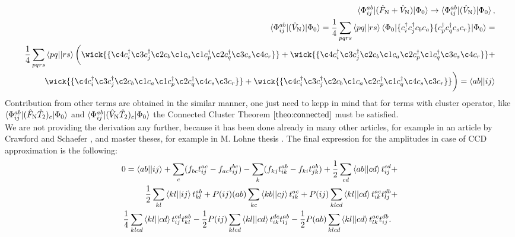 \documentclass[twoside,english]{uiofysmaster}
\theoremstyle{definition}
\begin{document}
\begin{eqnarray}
\braket{\Phi_{ij}^{ab}|(\hat{F}_\text{N}+\hat{V}_\text{N})|\Phi_0} \rightarrow \braket{\Phi_{ij}^{ab}|(\hat{V}_\text{N})|\Phi_0},\nonumber \\
\braket{\Phi_{ij}^{ab}|(\hat{V}_\text{N})|\Phi_0} = \frac{1}{4}\sum_{pqrs} \braket{pq||rs}\braket{\Phi_0| \{  c_i^\dagger c_j^\dagger  c_b  c_a \} \{  c_p^\dagger c_q^\dagger  c_s  c_r \} |\Phi_0}=\nonumber \\
 \frac{1}{4}\sum_{pqrs} \braket{pq||rs} \bigg( \wick{ \{ \c4 c_i^\dagger \c3 c_j^\dagger \c2 c_b \c1 c_a \c1  c_p^\dagger \c2 c_q^\dagger \c3 c_s \c4 c_r \}  } 
 + \wick{ \{ \c4 c_i^\dagger \c3 c_j^\dagger \c2 c_b \c1 c_a \c2  c_p^\dagger \c1 c_q^\dagger \c3 c_s \c4 c_r \}  } + \nonumber \\
  \wick{ \{ \c4 c_i^\dagger \c3 c_j^\dagger \c2 c_b \c1 c_a \c1  c_p^\dagger \c2 c_q^\dagger \c4 c_s \c3 c_r \}  }+\wick{ \{ \c4 c_i^\dagger \c3 c_j^\dagger \c2 c_b \c1 c_a \c2  c_p^\dagger \c1 c_q^\dagger \c4 c_s \c3 c_r \}  }  \bigg) =\braket{ab||ij}
\end{eqnarray}
Contribution from other terms are obtained in the similar manner, one just need to kepp in mind that for terms with cluster operator, like $\braket{\Phi_{ij}^{ab}|(\hat{F}_\text{N}\hat{T}_2)_c|\Phi_0}$ and $\braket{\Phi_{ij}^{ab}|(\hat{V}_\text{N}\hat{T}_2)_c|\Phi_0}$ the Connected Cluster Theorem $\ref{theo:connected}$ must be satisfied.\\
We are not providing the derivation any further, because it has been done already in many other articles, for example in an article by Crawford and Schaefer  \cite{crawfordIntroductionCoupledCluster2007}, and master theses, for example in M. Lohne thesis \cite{lohneCOUPLEDCLUSTERSTUDIESQUANTUMa}.
The final expression for the amplitudes in case of CCD approximation is the following:
\begin{eqnarray}\label{eq:CCD_ampl}
0 =\braket{ab||ij} + \sum_{c}(f_{bc}t_{ij}^{ac}-f_{ac}t_{ij}^{bc} ) - \sum_{k}(f_{kj}t_{ik}^{ab}-f_{ki}t_{jk}^{ab} ) +\frac{1}{2} \sum_{cd}\braket{ab||cd}t_{ij}^{cd} 
\nonumber &+\\
 \frac{1}{2} \sum_{kl}\braket{kl||ij}t_{kl}^{ab}  + P(ij)(ab)  \sum_{kc}\braket{kb||cj}t_{ik}^{ac} + 
  P(ij) \sum_{klcd}\braket{kl||cd}t_{ik}^{ac} t_{lj}^{db} \nonumber & + \\
 \frac{1}{4} \sum_{klcd}\braket{kl||cd}t_{ij}^{cd} t_{kl}^{ab}  
- \frac{1}{2} P(ij) \sum_{klcd}\braket{kl||cd}t_{ik}^{dc}t_{lj}^{ab}- \frac{1}{2} P(ab) \sum_{klcd}\braket{kl||cd}t_{lk}^{ac}t_{ij}^{db}.&  
\end{eqnarray}
\end{document}
